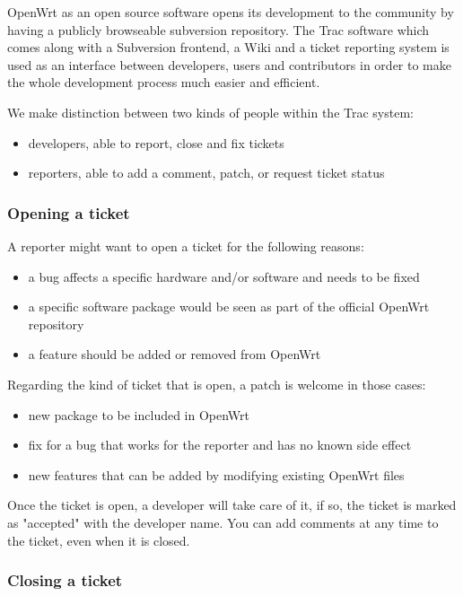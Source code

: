 OpenWrt as an open source software opens its development to the community by
having a publicly browseable subversion repository. The Trac software which
comes along with a Subversion frontend,  a Wiki and a ticket reporting system 
is used as an interface between developers, users and contributors in order to 
make the whole development process much easier and efficient.

We make distinction between two kinds of people within the Trac system:

\begin{itemize}
\item developers, able to report, close and fix tickets
\item reporters, able to add a comment, patch, or request ticket status
\end{itemize}

\subsubsection{Opening a ticket}

A reporter might want to open a ticket for the following reasons:

\begin{itemize}
\item a bug affects a specific hardware and/or software and needs to be fixed
\item a specific software package would be seen as part of the official OpenWrt repository
\item a feature should be added or removed from OpenWrt
\end{itemize}

Regarding the kind of ticket that is open, a patch is welcome in those cases:

\begin{itemize}
\item new package to be included in OpenWrt
\item fix for a bug that works for the reporter and has no known side effect
\item new features that can be added by modifying existing OpenWrt files
\end{itemize}

Once the ticket is open, a developer will take care of it, if so, the ticket is marked
as "accepted" with the developer name. You can add comments at any time to the ticket,
even when it is closed.

\subsubsection{Closing a ticket}

